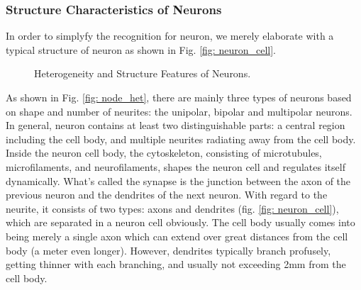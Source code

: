 \documentclass[journal,comsoc]{IEEEtran}
\begin{document}
			\subsubsection{Structure Characteristics of Neurons}
				In order to simplyfy the recognition for neuron, we merely elaborate with a typical structure of neuron as shown in Fig. \ref{fig: neuron_cell}.
				\begin{figure}[htbp]
					\centering
					\caption{Heterogeneity and Structure Features of Neurons.}
				\end{figure}
				As shown in Fig. \ref{fig: node_het}, there are mainly three types of neurons based on shape and number of neurites: the unipolar, bipolar and multipolar neurons\cite{bear2007neuroscience}. 
				In general, neuron contains at least two distinguishable parts: a central region including the cell body, and multiple neurites radiating away from the cell body. 
				Inside the neuron cell body, the cytoskeleton, consisting of microtubules, microfilaments, and neurofilaments, shapes the neuron cell and regulates itself dynamically. 
				What's called the synapse is the junction between the axon of the previous neuron and the dendrites of the next neuron.
				With regard to the neurite, it consists of two types: axons and dendrites (fig. \ref{fig: neuron_cell}), which are separated in a neuron cell obviously.
				The cell body usually comes into being merely a single axon which can extend over great distances from the cell body (a meter even longer).
				However, dendrites typically branch profusely, getting thinner with each branching, and usually not exceeding 2mm from the cell body.
		
\end{document}
